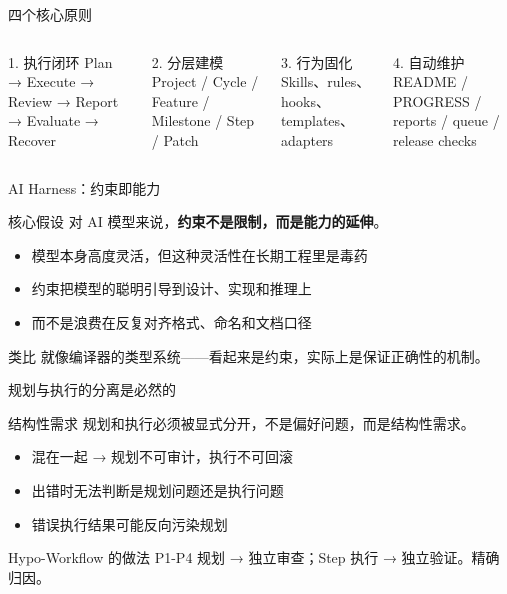 \documentclass[theme=workflow,aspectratio=169,fontset=tech]{Hypo-Slide}
\begin{document}
\begin{frame}{四个核心原则}
  \begin{columns}[T]
    \begin{block}{1. 执行闭环}
      Plan → Execute → Review → Report → Evaluate → Recover
    \end{block}
    \vspace{0.2cm}
    \begin{block}{2. 分层建模}
      Project / Cycle / Feature / Milestone / Step / Patch
    \end{block}
    \begin{block}{3. 行为固化}
      Skills、rules、hooks、templates、adapters
    \end{block}
    \vspace{0.2cm}
    \begin{block}{4. 自动维护}
      README / PROGRESS / reports / queue / release checks
    \end{block}
  \end{columns}
\end{frame}

\begin{frame}{AI Harness：约束即能力}
  \begin{block}{核心假设}
    对 AI 模型来说，\textbf{约束不是限制，而是能力的延伸}。
  \end{block}
  \begin{itemize}
    \item 模型本身高度灵活，但这种灵活性在长期工程里是毒药
    \item 约束把模型的聪明引导到设计、实现和推理上
    \item 而不是浪费在反复对齐格式、命名和文档口径
  \end{itemize}
  \begin{exampleblock}{类比}
    就像编译器的类型系统——看起来是约束，实际上是保证正确性的机制。
  \end{exampleblock}
\end{frame}

\begin{frame}{规划与执行的分离是必然的}
  \begin{block}{结构性需求}
    规划和执行必须被显式分开，不是偏好问题，而是结构性需求。
  \end{block}
  \begin{itemize}
    \item 混在一起 → 规划不可审计，执行不可回滚
    \item 出错时无法判断是规划问题还是执行问题
    \item 错误执行结果可能反向污染规划
  \end{itemize}
  \begin{block}{Hypo-Workflow 的做法}
    P1-P4 规划 → 独立审查；Step 执行 → 独立验证。精确归因。
  \end{block}
\end{frame}
\end{document}

